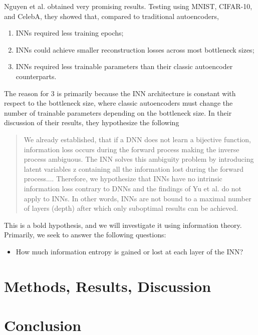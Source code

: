 \documentclass[12pt,letterpaper]{article}
\begin{document}
Nguyen et al. obtained very promising results.
Testing using MNIST, CIFAR-10, and CelebA, they showed that, compared to traditional autoencoders, \begin{enumerate}
   \item INNs required less training epochs;
   \item INNs could achieve smaller reconstruction losses across most bottleneck sizes;
   \item INNs required less trainable parameters than their classic autoencoder counterparts.
\end{enumerate}
The reason for 3 is primarily because the INN architecture is constant with respect to the bottleneck size, where classic autoencoders must change the number of trainable parameters depending on the bottleneck size. In their discussion of their results, they hypothesize the following
\begin{quotation}
   We already established, that if a DNN does not learn a bijective function, information loss occurs during the forward process making the inverse process ambiguous. The INN solves this ambiguity problem by introducing latent variables z containing all the information lost during the forward process.... Therefore, we hypothesize that INNs have no intrinsic information loss contrary to DNNs and the findings of Yu et al. do not apply to INNs. In other words, INNs are not bound to a maximal number of layers (depth) after which only suboptimal results can be achieved.
\end{quotation}
This is a bold hypothesis, and we will investigate it using information theory.
Primarily, we seek to answer the following questions: \begin{itemize}
   \item How much information entropy is gained or lost at each layer of the INN?
\end{itemize}


\section{Methods, Results, Discussion}

\section{Conclusion}

\pagebreak
{}

\end{document}
